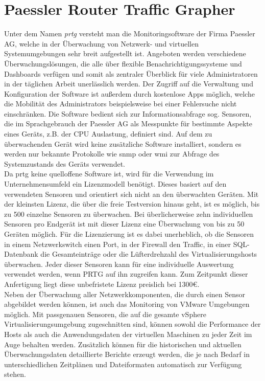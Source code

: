 \section{Paessler Router Traffic Grapher}
Unter dem Namen \textit{\acrfull{prtg}} versteht man die Monitoringsoftware der Firma Paessler AG, welche in der Überwachung von Netzwerk- und virtuellen Systemumgebungen sehr breit aufgestellt ist. Angeboten werden verschiedene Überwachungslösungen, die alle über flexible Benachrichtigungssysteme und Dashboards verfügen und somit als zentraler Überblick für viele Administratoren in der täglichen Arbeit unerlässlich werden. Der Zugriff auf die Verwaltung und Konfiguration der Software ist außerdem durch kostenlose Apps möglich, welche die Mobilität des Administrators beispielsweise bei einer Fehlersuche nicht einschränken. Die Software bedient sich zur Informationsabfrage sog. Sensoren, die im Sprachgebrauch der Paessler AG als Messpunkte für bestimmte Aspekte eines Geräts, z.B. der CPU Auslastung, definiert sind. Auf dem zu überwachenden Gerät wird keine zusätzliche Software installiert, sondern es werden nur bekannte Protokolle wie \acrshort{snmp} oder \acrshort{wmi} zur Abfrage des Systemzustands des Geräts verwendet. \cite{PaesslerAG2021}\medskip\\
Da \acrshort{prtg} keine quelloffene Software ist, wird für die Verwendung im Unternehmensumfeld ein Lizenzmodell benötigt. Dieses basiert auf den verwendeten Sensoren und orientiert sich nicht an den überwachten Geräten. Mit der kleinsten Lizenz, die über die freie Testversion hinaus geht, ist es möglich, bis zu 500 einzelne Sensoren zu überwachen. Bei überlicherweise zehn individuellen Sensoren pro Endgerät ist mit dieser Lizenz eine Überwachung von bis zu 50 Geräten möglich. Für die Lizenzierung ist es dabei unerheblich, ob die Sensoren in einem Netzwerkswitch einen Port, in der Firewall den Traffic, in einer SQL-Datenbank die Gesamteinträge oder die Lüfterdrehzahl des Virtualisierungshosts überwachen. Jeder dieser Sensoren kann für eine individuelle Auswertung verwendet werden, wenn PRTG auf ihn zugreifen kann. Zum Zeitpunkt dieser Anfertigung liegt diese unbefristete Lizenz preislich bei 1300€. \cite{PaesslerAG2021c}\medskip\\
Neben der Überwachung aller Netzwerkkomponenten, die durch einen Sensor abgebildet werden können, ist auch das Monitoring von VMware Umgebungen möglich. Mit passgenauen Sensoren, die auf die gesamte vSphere Virtualisierungsumgebung zugeschnitten sind, können sowohl die Performance der Hosts als auch die Anwendungsdaten der virtuellen Maschinen zu jeder Zeit im Auge behalten werden. Zusätzlich können für die historischen und aktuellen Überwachungsdaten detaillierte Berichte erzeugt werden, die je nach Bedarf in unterschiedlichen Zeitplänen und Dateiformaten automatisch zur Verfügung stehen.~\cite{PaesslerAG2021b}
